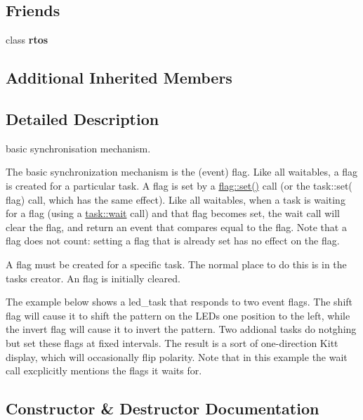 \subsection*{Friends}
\begin{DoxyCompactItemize}
\item 
class {\bfseries rtos}\hypertarget{classrtos_1_1flag_a2a7bcfc34141352757ad672e3ecd099f}{}\label{classrtos_1_1flag_a2a7bcfc34141352757ad672e3ecd099f}

\end{DoxyCompactItemize}
\subsection*{Additional Inherited Members}


\subsection{Detailed Description}
basic synchronisation mechanism. 

The basic synchronization mechanism is the (event) flag. Like all waitables, a flag is created for a particular task. A flag is set by a \hyperlink{classrtos_1_1flag_a0d2b78e288be5a3620a4f571b69f5e0a}{flag\+::set()} call (or the task\+::set( flag) call, which has the same effect). Like all waitables, when a task is waiting for a flag (using a \hyperlink{classrtos_1_1task__base_a32c6e19fe3d25a38587964defdb52ddc}{task\+::wait} call) and that flag becomes set, the wait call will clear the flag, and return an event that compares equal to the flag. Note that a flag does not count\+: setting a flag that is already set has no effect on the flag.

A flag must be created for a specific task. The normal place to do this is in the task\textquotesingle{}s creator. An flag is initially cleared.

The example below shows a led\+\_\+task that responds to two event flags. The shift flag will cause it to shift the pattern on the L\+E\+Ds one position to the left, while the invert flag will cause it to invert the pattern. Two addional tasks do notghing but set these flags at fixed intervals. The result is a sort of one-\/direction Kitt display, which will occasionally flip polarity. Note that in this example the wait call excplicitly mentions the flags it waits for. 

\subsection{Constructor \& Destructor Documentation}
